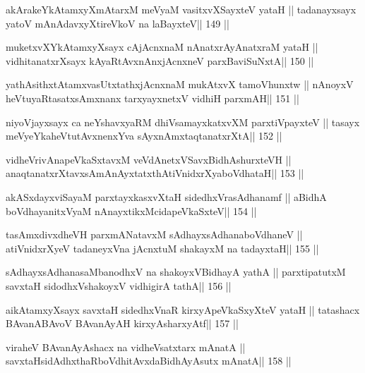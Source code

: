 \begin{shl}
akArakeYkAtamxyXmAtarxM meVyaM vasitxvXSayxteV yataH ||
tadanayxsayx yatoV mAnAdavxyXtireVkoV na laBayxteV\hfill || 149 ||
\end{shl}

\begin{shl}
muketxvXYkAtamxyXsayx cAjAcnxnaM nAnatxrAyAnatxraM yataH ||
vidhitanatxrXsayx kAyaRtAvxnAnxjAcnxneV parxBaviSuNxtA\hfill || 150 ||
\end{shl}

\begin{shl}
yathAsithxtAtamxvasUtxtathxjAcnxnaM mukAtxvX tamoVhunxtw ||
nAnoyxV heVtuyaRtasatxsAmxnanx tarxyayxnetxV vidhiH parxmAH\hfill || 151 ||
\end{shl}

\begin{shl}
niyoVjayxsayx ca neYshavxyaRM dhiVsamayxkatxvXM parxtiVpayxteV ||
tasayx meVyeYkaheVtutAvxnenxYva sAyxnAmxtaqtanatxrXtA\hfill || 152 ||
\end{shl}

\begin{shl}
vidheVrivAnapeVkaSxtavxM veVdAnetxVSavxBidhAshurxteVH ||
anaqtanatxrXtavxsAmAnAyxtatxthA\s tiVnidxrXyaboVdhataH\hfill || 153 ||
\end{shl}

\begin{shl}
akASxdayxviSayaM parxtayxkasxvXtaH sidedhxVrasAdhanamf ||
aBidhA boVdhayanitxVyaM nAnayxtikxMcidapeVkaSxteV\hfill || 154 ||
\end{shl}

\begin{shl}
tasAmxdivxdheVH parxmANatavxM sAdhayxsAdhanaboVdhaneV ||
atiVnidxrXyeV tadaneyxVna jAcnxtuM shakayxM na tadayxtaH\hfill || 155 ||
\end{shl}

\begin{shl}
sAdhayxsAdhanasaMbanodhxV na shakoyxV\s BidhayA yathA ||
parxtipatutxM savxtaH sidodhxV\s shakoyxV vidhigirA tathA\hfill || 156 ||
\end{shl}

\begin{shl}
aikAtamxyXsayx savxtaH sidedhxVnaR kirxyA\s peVkaSxyXteV yataH ||
tatashacx BAvanABAvoV BAvanAyAH kirxyAsharxyAtf\hfill || 157 ||
\end{shl}

\begin{shl}
viraheV BAvanAyAshacx na vidheVsatxtarx mAnatA ||
savxtaHsidAdhxthaRboVdhitAvxdaBidhAyAsutx mAnatA\hfill || 158 ||
\end{shl}

